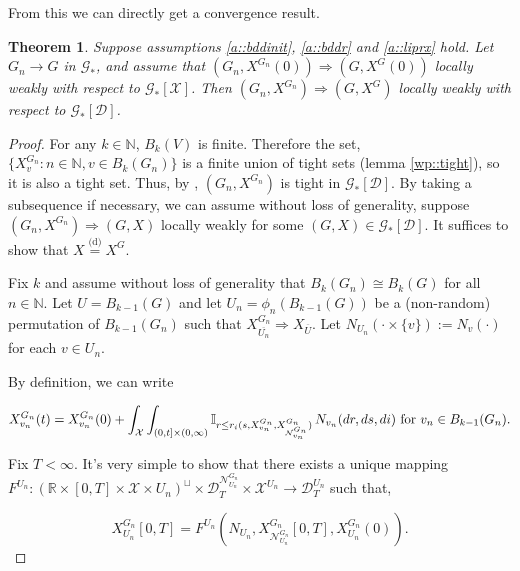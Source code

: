 \documentclass[12pt]{article}
\newcommand{\mb}{\mathbb}
\newcommand{\mc}{\mathcal}
\newcommand{\ra}{\rightarrow}
\newcommand{\ov}{\overline}
\newcommand{\te}{\text}
\newcommand{\ind}{\hspace{24pt}}
\newcommand{\deq}{\overset{\text{(d)}}{=}}			%
\newcommand{\defeq}{:=}								%
\newcommand{\cad}{\mc{D}}							%
\newcommand{\sta}{\mc{X}}							%
\newcommand{\gneigh}[2]{\mc{N}^{#1}_{#2}}			%
\newcommand{\cl}[1]{\ov{#1}}						%
\newcommand{\Xf}{X}									%
\newcommand{\poiss}{N}								%
\newcommand{\rate}{r}								%
\newcommand{\poissv}[1]{_{#1}}						%
\newcommand{\vind}[1]{_{#1}}						%
\newcommand{\tme}[1]{(#1)}							%
\newcommand{\tmi}[1]{#1}							%
\newcommand{\gind}[1]{^{#1}}						%
\newcommand{\vpara}[1]{^{#1}}						%
\newcommand{\stpara}[1]{_{#1}}						%
\newcommand{\tpara}[1]{_{#1}}						%
\newcommand{\Gs}{\mc{G}_\ast}						%
\newcommand{\tmepro}[3]{
\ifstrempty{#3}{
	(#1,#2)}{
	(#1,#2,#3)}}									%
\newcommand{\trnc}[1]{B_{#1}}						%
\renewcommand{\sp}[1]{[#1]}							%
\renewcommand{\it}[1]{_{#1}}						%
\newtheorem{thms}{Theorem}[section]
\begin{document}
From this we can directly get a convergence result.

\begin{thms}
Suppose assumptions \ref{a::bddinit}, \ref{a::bddr} and \ref{a::liprx} hold. Let \(G\it{n} \ra G\) in \(\Gs\), and assume that \((G\it{n},\Xf\gind{G\it{n}}\tme{0}) \Rightarrow (G,\Xf\gind{G}\tme{0})\) locally weakly with respect to \(\Gs\sp{\sta}\). Then \((G\it{n},\Xf\gind{G\it{n}}) \Rightarrow (G,\Xf\gind{G})\) locally weakly with respect to \(\Gs\sp{\cad}\).
\label{wp::lwcthm}
\end{thms}
\begin{proof}
For any \(k \in \mb{N}\), \(\trnc{k}(V)\) is finite. Therefore the set, \(\{\Xf\gind{G\it{n}}\vind{v}: n \in \mb{N}, v \in \trnc{k}(G\it{n})\}\) is a finite union of tight sets (lemma \ref{wp::tight}), so it is also a tight set. Thus, by \cite[Lemma A.6]{LacRamWu19}, \((G\it{n},\Xf\gind{G\it{n}})\) is tight in \(\Gs\sp{\cad}\). By taking a subsequence if necessary, we can assume without loss of generality, suppose \((G\it{n},\Xf\gind{G\it{n}}) \Rightarrow (G,\Xf)\) locally weakly for some \((G,\Xf) \in \Gs\sp{\cad}\). It suffices to show that \(\Xf \deq \Xf\gind{G}\).

\ind Fix \(k\) and assume without loss of generality that \(\trnc{k}(G\it{n}) \cong \trnc{k}(G)\) for all \(n\in \mb{N}\). Let \(U = \trnc{k-1}(G)\) and let \(U\it{n} = \phi_n(\trnc{k-1}(G))\) be a (non-random) permutation of \(\trnc{k-1}(G\it{n})\) such that \(\Xf\gind{G\it{n}}\vind{\cl{U\it{n}}} \Rightarrow \Xf\vind{\cl{U}}\). Let \(\poiss\poissv{U\it{n}}(\cdot\times \{v\}) \defeq \poiss\poissv{v}(\cdot)\) for each \(v \in U\it{n}\).

\ind By definition, we can write

\[\Xf\gind{G\it{n}}\vind{v\it{n}}\tme{t} = \Xf\gind{G\it{n}}\vind{v\it{n}}\tme{0} + \int_\sta\int_{(0,t]\times (0,\infty)} \mb{I}_{r \leq \rate\stpara{i}\tmepro{s}{\Xf\gind{G\it{n}}\vind{v\it{n}}}{\Xf\gind{G\it{n}}\vind{\gneigh{G\it{n}}{v\it{n}}}}}\,\poiss\poissv{v\it{n}}(dr,ds,di) \te{ for } v\it{n}\in \trnc{k-1}(G\it{n}).\]

Fix \(T < \infty\). It's very simple to show that there exists a unique mapping \(F\vpara{U\it{n}}:(\mb{R}\times [0,T]\times \sta \times U\it{n})^\sqcup \times \cad\tpara{T}\vpara{\gneigh{G\it{n}}{U\it{n}}} \times \sta\vpara{U\it{n}} \ra \cad\vpara{U\it{n}}\tpara{T}\) such that,

\[\Xf\gind{G\it{n}}\vind{U\it{n}}\tmi{[0,T]} = F\vpara{U\it{n}}\left(\poiss\poissv{U\it{n}}, \Xf\gind{G\it{n}}\vind{\gneigh{G\it{n}}{U\it{n}}}\tmi{[0,T]}, \Xf\gind{G\it{n}}\vind{U\it{n}}\tme{0}\right).\]


\end{proof}
\end{document}
